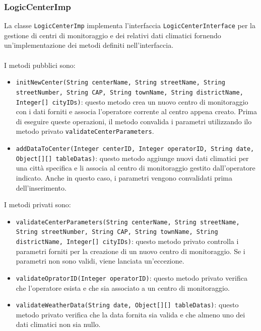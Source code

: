 \subsubsection{LogicCenterImp}
La classe \texttt{LogicCenterImp} implementa l'interfaccia \texttt{LogicCenterInterface} per la gestione di centri di monitoraggio e dei relativi dati climatici
fornendo un'implementazione dei metodi definiti nell'interfaccia.\\
\\
I metodi pubblici sono:
\begin{itemize}
      \item \texttt{initNewCenter(String centerName, String streetName, String streetNumber, String CAP, String townName, String districtName, Integer[] cityIDs)}:
            questo metodo crea un nuovo centro di monitoraggio con i dati forniti e associa l'operatore corrente al centro appena creato.
            Prima di eseguire queste operazioni, il metodo convalida i parametri utilizzando ilo metodo privato \texttt{validateCenterParameters}.
      \item \texttt{addDataToCenter(Integer centerID, Integer operatorID, String date, Object[][] tableDatas)}:
            questo metodo aggiunge nuovi dati climatici per una città specifica e li associa al centro di monitoraggio gestito dall'operatore indicato.
            Anche in questo caso, i parametri vengono convalidati prima dell'inserimento.
\end{itemize}
I metodi privati sono:
\begin{itemize}
      \item \texttt{validateCenterParameters(String centerName, String streetName, String streetNumber, String CAP, String townName, String districtName, Integer[] cityIDs)}:
            questo metodo privato controlla i parametri forniti per la creazione di un nuovo centro di monitoraggio. Se i parametri non sono validi, viene lanciata un'eccezione.
      \item \texttt{validateOpratorID(Integer operatorID)}:
            questo metodo privato verifica che l'operatore esista e che sia associato a un centro di monitoraggio.
      \item \texttt{validateWeatherData(String date, Object[][] tableDatas)}:
            questo metodo privato verifica che la data fornita sia valida e che almeno uno dei dati climatici non sia nullo.
\end{itemize}

